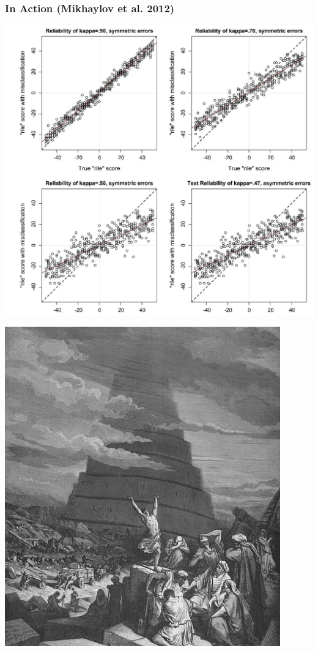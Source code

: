 \documentclass[11pt,compress,professionalfonts]{beamer}
\begin{document}
\begin{frame}[t]\frametitle{In Action (Mikhaylov et al. 2012)}

\centerline{\includegraphics[scale=.6]{pictures/slava-rile}}


\newpage
\centerline{\includegraphics[scale=1]{pictures/confusionoftongues.png}}


\end{frame}
\end{document}
